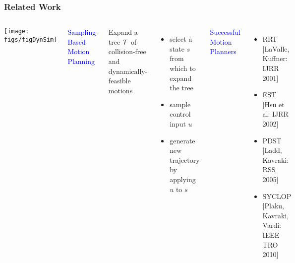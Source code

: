\documentclass[10pt,t]{beamer}
\begin{document}
\begin{frame}
\frametitle{Related Work}

\begin{columns}[c]




\texttt{[image: figs/figDynSim]}


\textcolor{blue}{Sampling-Based Motion Planning}
\vspace*{2mm}

Expand a tree $\mathcal{T}$ of collision-free and dynamically-feasible
motions

\vspace*{2mm}

\begin{itemize}
\item select a state $s$ from which to expand the tree

\vspace*{2mm}

\item sample control input $u$

\vspace*{2mm}

\item generate new trajectory by applying $u$ to $s$
\end{itemize}

\hspace*{3mm}
\textcolor{blue}{Successful Motion Planners}
{\footnotesize{
\begin{itemize}
\item RRT [LaValle, Kuffner: IJRR 2001]
\item EST [Hsu et al: IJRR 2002]
\item PDST [Ladd, Kavraki: RSS 2005]
\item SYCLOP [Plaku, Kavraki, Vardi: IEEE TRO 2010]
\end{itemize}
}}

\end{columns}
\end{frame}
\end{document}
